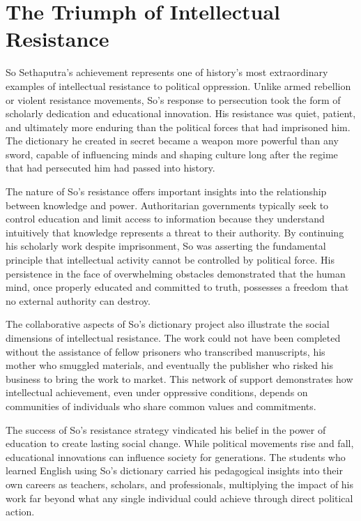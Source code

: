 \documentclass[
  Letterpaper,
]{scrbook}
\begin{document}
\section{The Triumph of Intellectual
Resistance}\label{the-triumph-of-intellectual-resistance}

So Sethaputra's achievement represents one of history's most
extraordinary examples of intellectual resistance to political
oppression. Unlike armed rebellion or violent resistance movements, So's
response to persecution took the form of scholarly dedication and
educational innovation. His resistance was quiet, patient, and
ultimately more enduring than the political forces that had imprisoned
him. The dictionary he created in secret became a weapon more powerful
than any sword, capable of influencing minds and shaping culture long
after the regime that had persecuted him had passed into history.

The nature of So's resistance offers important insights into the
relationship between knowledge and power. Authoritarian governments
typically seek to control education and limit access to information
because they understand intuitively that knowledge represents a threat
to their authority. By continuing his scholarly work despite
imprisonment, So was asserting the fundamental principle that
intellectual activity cannot be controlled by political force. His
persistence in the face of overwhelming obstacles demonstrated that the
human mind, once properly educated and committed to truth, possesses a
freedom that no external authority can destroy.

The collaborative aspects of So's dictionary project also illustrate the
social dimensions of intellectual resistance. The work could not have
been completed without the assistance of fellow prisoners who
transcribed manuscripts, his mother who smuggled materials, and
eventually the publisher who risked his business to bring the work to
market. This network of support demonstrates how intellectual
achievement, even under oppressive conditions, depends on communities of
individuals who share common values and commitments.

The success of So's resistance strategy vindicated his belief in the
power of education to create lasting social change. While political
movements rise and fall, educational innovations can influence society
for generations. The students who learned English using So's dictionary
carried his pedagogical insights into their own careers as teachers,
scholars, and professionals, multiplying the impact of his work far
beyond what any single individual could achieve through direct political
action.
\end{document}
